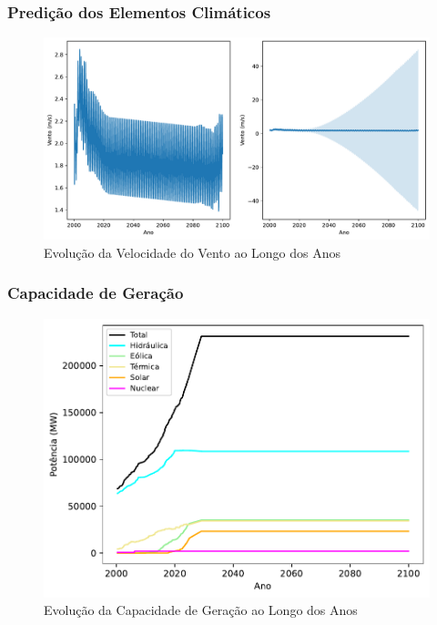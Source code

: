 \documentclass{beamer}
\begin{document}
\begin{frame}
\frametitle{Predição dos Elementos Climáticos}
\begin{figure}
    \centering
    \includegraphics[width=0.9\linewidth]{vento.pdf}
    \caption{Evolução da Velocidade do Vento ao Longo dos Anos}
\end{figure}
\end{frame}


\begin{frame}
\frametitle{Capacidade de Geração}
\begin{figure}
    \centering
    \includegraphics[width=0.6\linewidth]{capacidade-geracao.pdf}
    \caption{Evolução da Capacidade de Geração ao Longo dos Anos}
\end{figure}
\end{frame}
\end{document}
